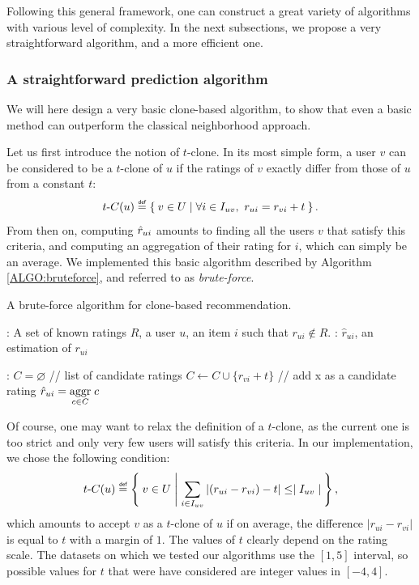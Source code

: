 Following this general framework, one can construct a great variety of
algorithms with various level of complexity. In the next subsections, we
propose a very straightforward algorithm, and a more efficient one.

\subsubsection{A straightforward prediction algorithm}
\label{STRAIGHTFORWARD}

We will here design a very basic clone-based algorithm, to show that even a
basic method can outperform the classical neighborhood approach.

Let us first introduce the notion of $t$-clone. In its most simple form, a
user $v$ can be considered to be a $t$-clone of $u$ if the ratings of $v$
exactly differ from those of $u$ from a constant $t$:
$$
t\text{-}C(u) \eqdef \Set{v \in U | \forall i \in I_{uv},~ r_{ui} = r_{vi} + t}.
$$
From then on, computing $\hat{r}_{ui}$ amounts to finding all the users $v$ that
satisfy this criteria, and computing an aggregation of their rating for $i$,
which can simply be an average. We implemented this basic algorithm described
by Algorithm \ref{ALGO:bruteforce}, and referred to as \textit{brute-force}.

 \begin{algorithm}[!ht]
   \caption{A brute-force algorithm for clone-based recommendation.}
       \label{ALGO:bruteforce}
       \begin{algorithmic}

      : A set of known ratings $R$, a user $u$, an item
      $i$ such that $r_{ui} \notin R$.
      : $\hat{r}_{ui}$, an estimation of $r_{ui}$

      :
      \STATE $C = \varnothing$ \quad \quad // list of candidate ratings
          \STATE $C \gets C \cup \{r_{vi} + t\}$ \quad // add x as a candidate rating
          \ENDIF
        \ENDFOR
	    \ENDFOR
    \STATE $\hat{r}_{ui} = \underset{c \in C}{\operatorname{aggr}}\; c$
\end{algorithmic}
\end{algorithm}

Of course, one may want to relax the definition of a $t$-clone, as the current
one is too strict and only very few users will satisfy this criteria. In our
implementation, we chose the following condition:
$$
t\text{-}C(u) \eqdef \Set{v \in U |  \sum_{i \in I_{uv}} |(r_{ui} - r_{vi}) -
t| \leq \mid I_{uv}\mid},$$
which amounts to accept $v$ as a $t$-clone of $u$ if on average, the
difference $|r_{ui} - r_{vi}|$ is equal to $t$ with a margin of $1$.
The values of $t$ clearly depend on the rating scale. The datasets on which we
tested our algorithms use the $[1, 5]$ interval, so possible values for $t$
that were have considered are integer values in $[-4, 4]$.

